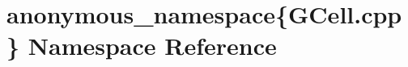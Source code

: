 \hypertarget{namespaceanonymous__namespace_02GCell_8cpp_03}{}\section{anonymous\+\_\+namespace\{G\+Cell.\+cpp\} Namespace Reference}
\label{namespaceanonymous__namespace_02GCell_8cpp_03}
